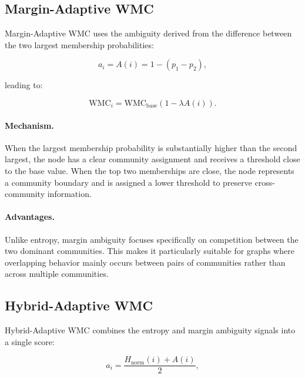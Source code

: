 \documentclass[a4paper,11pt,oneside,onecolumn,preprint]{elsarticle}
\numberwithin{equation}{section}
\begin{document}
\subsection{Margin-Adaptive WMC}
\label{subsec:margin-adaptive}

Margin-Adaptive WMC uses the ambiguity derived from the difference between the two largest membership probabilities:

\begin{equation}
a_i=A(i)=1-(p_1-p_2),
\label{eq:margin-score}
\end{equation}

leading to:

\begin{equation}
\mathrm{WMC}_i =
\mathrm{WMC}_{\mathrm{base}}
(1-\lambda A(i)).
\label{eq:margin-adaptive}
\end{equation}

\paragraph{Mechanism.}

When the largest membership probability is substantially higher than the second largest, the node has a clear community assignment and receives a threshold close to the base value.
When the top two memberships are close, the node represents a community boundary and is assigned a lower threshold to preserve cross-community information.

\paragraph{Advantages.}

Unlike entropy, margin ambiguity focuses specifically on competition between the two dominant communities.
This makes it particularly suitable for graphs where overlapping behavior mainly occurs between pairs of communities rather than across multiple communities.


\subsection{Hybrid-Adaptive WMC}
\label{subsec:hybrid-adaptive}

Hybrid-Adaptive WMC combines the entropy and margin ambiguity signals into a single score:

\begin{equation}
a_i = \frac{H_{\mathrm{norm}}(i) + A(i)}{2},
\label{eq:hybrid-score}
\end{equation}
\end{document}

